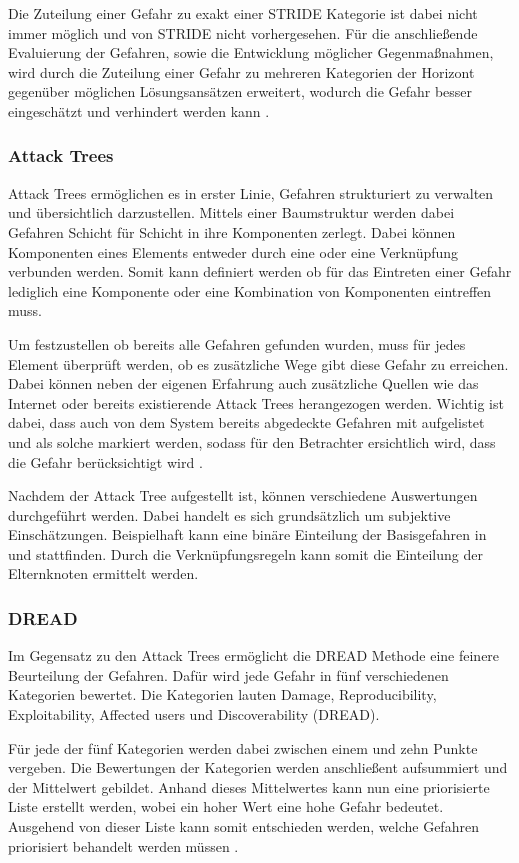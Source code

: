 Die Zuteilung einer Gefahr zu exakt einer STRIDE Kategorie ist dabei nicht immer möglich und von STRIDE nicht vorhergesehen.
Für die anschließende Evaluierung der Gefahren, sowie die Entwicklung möglicher Gegenmaßnahmen, wird durch die Zuteilung einer Gefahr zu mehreren Kategorien der Horizont gegenüber möglichen Lösungsansätzen erweitert, wodurch die Gefahr besser eingeschätzt und verhindert werden kann \autocite[vgl.][S. 61-64]{shostack_threat_2014}.

\subsubsection{Attack Trees}
Attack Trees ermöglichen es in erster Linie, Gefahren strukturiert zu verwalten und übersichtlich darzustellen.
Mittels einer Baumstruktur werden dabei Gefahren Schicht für Schicht in ihre Komponenten zerlegt.
Dabei können Komponenten eines Elements entweder durch eine  oder eine  Verknüpfung verbunden werden.
Somit kann definiert werden ob für das Eintreten einer Gefahr lediglich eine Komponente oder eine Kombination von Komponenten eintreffen muss.

Um festzustellen ob bereits alle Gefahren gefunden wurden, muss für jedes Element überprüft werden, ob es zusätzliche Wege gibt diese Gefahr zu erreichen.
Dabei können neben der eigenen Erfahrung auch zusätzliche Quellen wie das Internet oder bereits existierende Attack Trees herangezogen werden.
Wichtig ist dabei, dass auch von dem System bereits abgedeckte Gefahren mit aufgelistet und als solche markiert werden, sodass für den Betrachter ersichtlich wird, dass die Gefahr berücksichtigt wird \autocite[vgl.][S. 88-94]{shostack_threat_2014}.

Nachdem der Attack Tree aufgestellt ist, können verschiedene Auswertungen durchgeführt werden.
Dabei handelt es sich grundsätzlich um subjektive Einschätzungen.
Beispielhaft kann eine binäre Einteilung der Basisgefahren in  und  stattfinden.
Durch die Verknüpfungsregeln kann somit die Einteilung der Elternknoten ermittelt werden.

\subsubsection{DREAD}
Im Gegensatz zu den Attack Trees ermöglicht die DREAD Methode eine feinere Beurteilung der Gefahren.
Dafür wird jede Gefahr in fünf verschiedenen Kategorien bewertet.
Die Kategorien lauten Damage, Reproducibility, Exploitability, Affected users und Discoverability (DREAD).

Für jede der fünf Kategorien werden dabei zwischen einem und zehn Punkte vergeben.
Die Bewertungen der Kategorien werden anschließent aufsummiert und der Mittelwert gebildet.
Anhand dieses Mittelwertes kann nun eine priorisierte Liste erstellt werden, wobei ein hoher Wert eine hohe Gefahr bedeutet.
Ausgehend von dieser Liste kann somit entschieden werden, welche Gefahren priorisiert behandelt werden müssen \autocite[vgl.][]{domars_threat_2023}.

